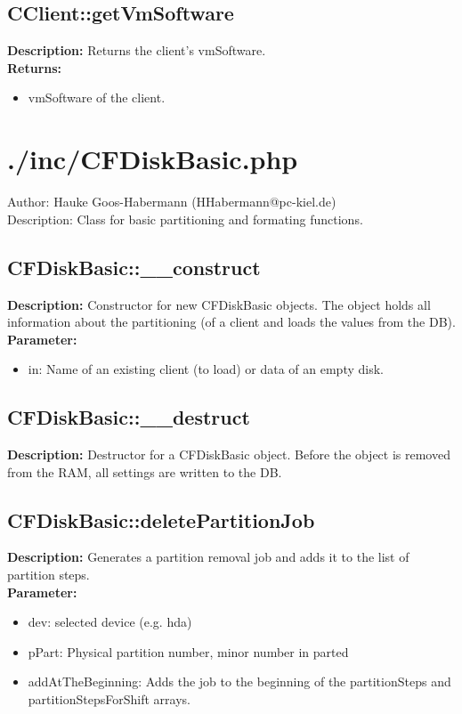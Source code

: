 \subsection{CClient::getVmSoftware}
\textbf{Description:} Returns the client's vmSoftware.\\
\textbf{Returns:}
\begin{itemize}
\item vmSoftware of the client.
\end{itemize}

\newpage\section{./inc/CFDiskBasic.php}
 Author: Hauke Goos-Habermann (HHabermann@pc-kiel.de)\\
 Description: Class for basic partitioning and formating functions.\\

\subsection{CFDiskBasic::\_\_construct}
\textbf{Description:} Constructor for new CFDiskBasic objects. The object holds all information about the partitioning (of a client and loads the values from the DB).\\
\textbf{Parameter:}
\begin{itemize}
\item in: Name of an existing client (to load) or data of an empty disk.
\end{itemize}

\subsection{CFDiskBasic::\_\_destruct}
\textbf{Description:} Destructor for a CFDiskBasic object. Before the object is removed from the RAM, all settings are written to the DB.\\

\subsection{CFDiskBasic::deletePartitionJob}
\textbf{Description:} Generates a partition removal job and adds it to the list of partition steps.\\
\textbf{Parameter:}
\begin{itemize}
\item dev: selected device (e.g. hda)
\item pPart: Physical partition number, minor number in parted
\item addAtTheBeginning: Adds the job to the beginning of the partitionSteps and partitionStepsForShift arrays.
\end{itemize}

